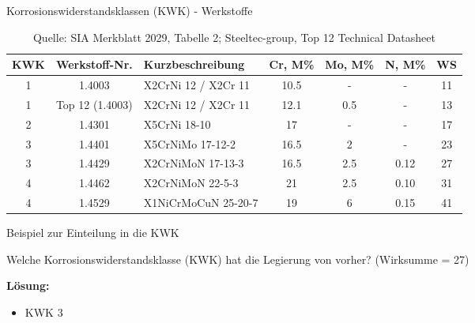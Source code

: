 \begin{frame}{Korrosionswiderstandsklassen (KWK) - Werkstoffe}
    \begin{table}[ht]
        \centering
        \renewcommand{\arraystretch}{1.2} %
        \begin{tabular}{|c|c|l|c|c|c|c|}
            \hline
            \rowcolor{blue!20} \textbf{KWK} & \textbf{Werkstoff-Nr.} & \textbf{Kurzbeschreibung} & \textbf{Cr, M\%} & \textbf{Mo, M\%} & \textbf{N, M\%} & \textbf{WS} \\
            \hline
            1 & 1.4003 & X2CrNi 12 / X2Cr 11 & 10.5 & - & - & 11 \\
            \hline
            1 & Top 12 (1.4003) & X2CrNi 12 / X2Cr 11 & 12.1 & 0.5 & - & 13 \\
            \hline
            2 & 1.4301 & X5CrNi 18-10 & 17 & - & - & 17 \\
            \hline
            3 & 1.4401 & X5CrNiMo 17-12-2 & 16.5 & 2 & - & 23 \\
            \hline
            3 & 1.4429 & X2CrNiMoN 17-13-3 & 16.5 & 2.5 & 0.12 & 27 \\
            \hline
            4 & 1.4462 & X2CrNiMoN 22-5-3 & 21 & 2.5 & 0.10 & 31 \\
            \hline
            4 & 1.4529 & X1NiCrMoCuN 25-20-7 & 19 & 6 & 0.15 & 41 \\
            \hline
        \end{tabular}
        \caption{Quelle: SIA Merkblatt 2029, Tabelle 2; Steeltec-group, Top 12 Technical Datasheet}
        \label{tab:kwk_werkstoffe}
    \end{table}
\end{frame}

\begin{frame}{Beispiel zur Einteilung in die KWK}
    \begin{Fragenblock}
        Welche Korrosionswiderstandsklasse (KWK) hat die Legierung von vorher? (Wirksumme = 27)
    \end{Fragenblock}


    \pause
    \begin{myLösung}
        \textbf{Lösung:}
        \begin{itemize}
            \item[\faCheckSquare] KWK 3
        \end{itemize}
    \end{myLösung}
\end{frame}

